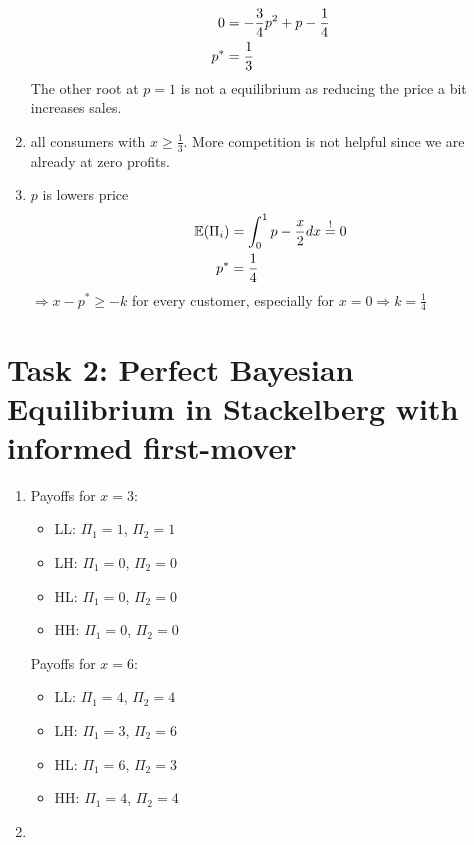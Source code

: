 \documentclass{article}
\newcommand{\E}{\mathbb{E}}
\begin{document}
\begin{enumerate}[label=(\alph*)]
\begin{align}
			0 &= -\frac{3}{4}p^2 + p - \frac{1}{4} \notag \\
			p^\ast &= \frac{1}{3} \notag
		\end{align}
		The other root at $p=1$ is not a equilibrium as reducing the price a bit increases sales.
		\item all consumers with $x\ge \frac{1}{3}$. More competition is not helpful since we are already at zero profits.
		\item $p$ is lowers price
		\begin{align}
			\E(\Pi_i) &= \int_0^1 p-\frac{x}{2} dx \overset{!}{=} 0 \notag \\
			p^\ast &= \frac{1}{4} \notag
		\end{align}
		$\Rightarrow x-p^\ast \ge -k$ for every customer, especially for $x = 0 \Rightarrow k= \frac{1}{4}$
	\end{enumerate}

	\section*{Task 2: Perfect Bayesian Equilibrium in Stackelberg with informed first-mover}
	\begin{enumerate}[label=(\alph*)]
		\item Payoffs for $x=3$:
		\begin{itemize}
			\item LL: $\Pi_1 = 1$, $\Pi_2 = 1$
			\item LH: $\Pi_1 = 0$, $\Pi_2 = 0$
			\item HL: $\Pi_1 = 0$, $\Pi_2 = 0$
			\item HH: $\Pi_1 = 0$, $\Pi_2 = 0$
		\end{itemize}
		Payoffs for $x=6$:
		\begin{itemize}
			\item LL: $\Pi_1 = 4$, $\Pi_2 = 4$
			\item LH: $\Pi_1 = 3$, $\Pi_2 = 6$
			\item HL: $\Pi_1 = 6$, $\Pi_2 = 3$
			\item HH: $\Pi_1 = 4$, $\Pi_2 = 4$
		\end{itemize}
		\item 
	\end{enumerate}
\end{document}
